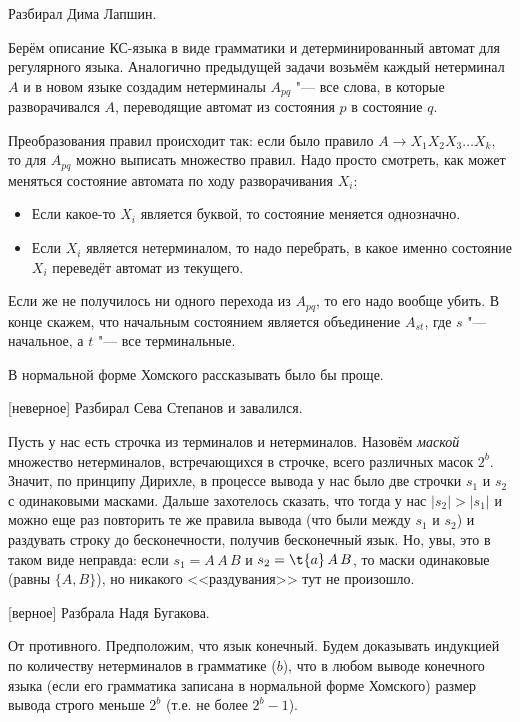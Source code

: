 	Разбирал Дима Лапшин.

	Берём описание КС-языка в виде грамматики и детерминированный автомат для регулярного языка.
	Аналогично предыдущей задачи возьмём каждый нетерминал $A$ и в новом языке создадим
	нетерминалы $A_{pq}$ "--- все слова, в которые разворачивался $A$, переводящие автомат
	из состояния $p$ в состояние $q$.

	Преобразования правил происходит так: если было правило $A \to X_1X_2X_3\dots X_k$, то для $A_{pq}$ можно выписать множество правил.
	Надо просто смотреть, как может меняться состояние автомата по ходу разворачивания $X_i$:
	\begin{itemize}
		\item
			Если какое-то $X_i$ является буквой, то состояние меняется однозначно.
		\item
			Если $X_i$ является нетерминалом, то надо перебрать, в какое именно состояние $X_i$ переведёт автомат из текущего.
	\end{itemize}
	Если же не получилось ни одного перехода из $A_{pq}$, то его надо вообще убить.
	В конце скажем, что начальным состоянием является объединение $A_{st}$, где $s$ "--- начальное, а $t$ "--- все терминальные.

	\begin{Rem}
		В нормальной форме Хомского рассказывать было бы проще.
	\end{Rem}

[неверное]\label{prob27_wrong}
	Разбирал Сева Степанов и завалился.

	Пусть у нас есть строчка из терминалов и нетерминалов.
	Назовём \textit{маской} множество нетерминалов, встречающихся в строчке,
	всего различных масок $2^b$.
	Значит, по принципу Дирихле, в процессе вывода у нас было две строчки $s_1$ и $s_2$ с одинаковыми масками.
	Дальше захотелось сказать, что тогда у нас $|s_2|>|s_1|$ и можно еще раз повторить
	те же правила вывода (что были между $s_1$ и $s_2$) и раздувать строку до бесконечности, получив бесконечный язык.
	Но, увы, это в таком виде неправда: если $s_1=A\,A\,B$ и $s_2=\t{a}\,A\,B$, то маски одинаковые (равны $\{A, B\}$),
	но никакого <<раздувания>> тут не произошло.

[верное]\label{prob27}
	Разбрала Надя Бугакова.

	От противного.
	Предположим, что язык конечный.
	Будем доказывать индукцией по количеству нетерминалов в грамматике ($b$), что в любом выводе конечного языка
	(если его грамматика записана в нормальной форме Хомского) размер вывода строго меньше $2^b$ (т.е. не более $2^b-1$).

